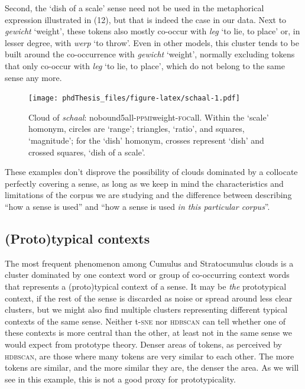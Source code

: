 \documentclass[
]{book}
\begin{document}
Second, the `dish of a scale' sense need not be used in the metaphorical expression illustrated in (12), but that is indeed the case in our data. Next to \emph{gewicht} `weight', these tokens also mostly co-occur with \emph{leg} `to lie, to place' or, in lesser degree, with \emph{werp} `to throw'. Even in other models, this cluster tends to be built around the co-occurrence with \emph{gewicht} `weight', normally excluding tokens that only co-occur with \emph{leg} `to lie, to place', which do not belong to the same sense any more.



\begin{figure}
\centering
\texttt{[image: phdThesis\_files/figure-latex/schaal-1.pdf]}
\caption{\label{fig:schaal}Cloud of \emph{schaal}: nobound5all-\textsc{ppmi}weight-\textsc{foc}all. Within the `scale' homonym, circles are `range'; triangles, `ratio', and squares, `magnitude'; for the `dish' homonym, crosses represent `dish' and crossed squares, `dish of a scale'.}
\end{figure}

These examples don't disprove the possibility of clouds dominated by a collocate perfectly covering a sense, as long as we keep in mind the characteristics and limitations of the corpus we are studying and the difference between describing ``how a sense is used'' and ``how a sense is used \emph{in this particular corpus}''.

\hypertarget{prototypical-clouds}{%
\subsection{(Proto)typical contexts}\label{prototypical-clouds}}

The most frequent phenomenon among Cumulus and Stratocumulus clouds is a cluster dominated by one context word or group of co-occurring context words that represents a (proto)typical context of a sense. It may be \emph{the} prototypical context, if the rest of the sense is discarded as noise or spread around less clear clusters, but we might also find multiple clusters representing different typical contexts of the same sense. Neither t-\textsc{sne} nor \textsc{hdbscan} can tell whether one of these contexts is more central than the other, at least not in the same sense we would expect from prototype theory. Denser areas of tokens, as perceived by \textsc{hdbscan}, are those where many tokens are very similar to each other. The more tokens are similar, and the more similar they are, the denser the area. As we will see in this example, this is not a good proxy for prototypicality.
\end{document}
